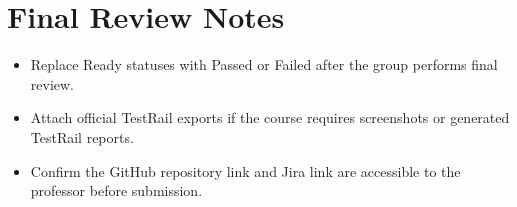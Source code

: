\documentclass[12pt]{article}
\begin{document}
\section{Final Review Notes}
\begin{itemize}[leftmargin=*]
  \item Replace Ready statuses with Passed or Failed after the group performs final review.
  \item Attach official TestRail exports if the course requires screenshots or generated TestRail reports.
  \item Confirm the GitHub repository link and Jira link are accessible to the professor before submission.
\end{itemize}
\end{document}
